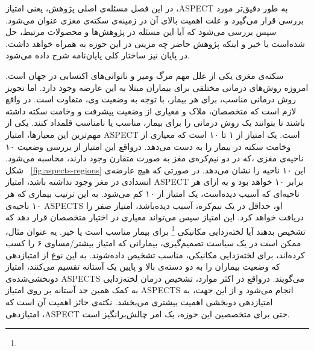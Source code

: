 

در این فصل مسئله‌ی اصلی پژوهش، یعنی امتیاز ،ASPECT به طور دقیق‌تر مورد بررسی قرار می‌گیرد و علت اهمیت بالای آن در زمینه‌ی سکته‌ی مغزی عنوان می‌شود.
سپس بررسی می‌شود که آیا این مسئله در پژوهش‌ها و محصولات مرتبط، حل شده‌است یا خیر و اینکه پژوهش حاضر چه مزیتی در این حوزه به همراه خواهد داشت.
در پایان نیز ساختار کلی پایان‌نامه شرح داده می‌شود.


سکته‌ی مغزی یکی از علل مهم مرگ ومیر و ناتوانی‌های اکتسابی در جهان است.
امروزه روش‌های درمانی مختلفی برای بیماران مبتلا به این عارضه وجود دارد.
اما تجویز روش درمانی مناسب، برای هر بیمار، با توجه به وضعیت وی، متفاوت است.
در واقع لازم است که متخصصان، ملاک و معیاری از وضعیت پیشرفت و وخامت سکته داشته باشند تا بتوانند یک روش درمانی را برای بیمار، مناسب یا نامناسب قلمداد کنند.
یکی از مهم‌ترین این معیارها، امتیاز ASPECT است. 
 یک امتیاز از ۱ تا ۱۰ است که معیاری از وخامت سکته در بیمار را به دست می‌دهد.
درواقع این امتیاز از بررسی وضعیت ۱۰ ناحیه‌ی مغزی ،که در دو نیم‌کره‌ی مغز به صورت متقارن وجود دارند، محاسبه می‌شود.
شکل ~\ref{fig:aspects-regions} این ۱۰ ناحیه را نشان می‌دهد.
در صورتی که هیچ عارضه‌ی انسدادی در مغز وجود نداشته باشد، امتیاز ASPECT برابر ۱۰ خواهد بود و به ازای هر ناحیه‌ای که آسیب دیده‌است، یک امتیاز از ۱۰ کم می‌شود.
به این ترتیب بیماری که هر ۱۰ ناحیه‌ی ASPECTS او، حداقل در یک نیم‌کره، آسیب دیده‌باشد، امتیاز صفر را دریافت خواهد کرد.
این امتیاز سپس می‌تواند معیاری در اختیار متخصصان قرار دهد که تشخیص بدهند آیا لخته‌زدایی مکانیکی
\footnote[]{}
برای بیمار مناسب است یا خیر.
یه عنوان مثال، ممکن است در یک سیاست تصمیم‌گیری، بیمارانی که امتیاز بیشتر/مساوی ۶ را کسب کرده‌اند، برای لخته‌زدایی مکانیکی، مناسب تشخیص داده‌شوند.
به این نوع از امتیازدهی که وضعیت بیماران را به دو دسته‌ی بالا و پایین یک آستانه تقسیم می‌کنند، امتیاز دوبخشی‌شده‌ی ASPECTS می‌گویند.
درواقع در اکثر موارد، تشخیص درمان لخته‌زدایی به کمک همین حد آستانه بر روی امتیاز ASPECTS انجام می‌شود و از این جهت، به امتیاز‌دهی دوبخشی اهمیت بیشتری می‌بخشد. 
نکته‌ی حائز اهمیت آن است که امتیازدهی ،ASPECT حتی برای متخصصین این حوزه، یک امر چالش‌بر‌انگیز است.
